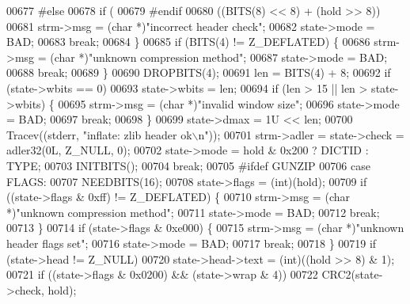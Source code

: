 \begin{DoxyCode}
{{{{00677 #\textcolor{keywordflow}{else}
00678             if (
00679 #endif
00680                 ((BITS(8) << 8) + (hold >> 8)) %
00681                 strm->msg = (\textcolor{keywordtype}{char} *)\textcolor{stringliteral}{"incorrect header check"};
00682                 state->mode = BAD;
00683                 \textcolor{keywordflow}{break};
00684             \}
00685             \textcolor{keywordflow}{if} (BITS(4) != Z\_DEFLATED) \{
00686                 strm->msg = (\textcolor{keywordtype}{char} *)\textcolor{stringliteral}{"unknown compression method"};
00687                 state->mode = BAD;
00688                 \textcolor{keywordflow}{break};
00689             \}
00690             DROPBITS(4);
00691             len = BITS(4) + 8;
00692             \textcolor{keywordflow}{if} (state->wbits == 0)
00693                 state->wbits = len;
00694             \textcolor{keywordflow}{if} (len > 15 || len > state->wbits) \{
00695                 strm->msg = (\textcolor{keywordtype}{char} *)\textcolor{stringliteral}{"invalid window size"};
00696                 state->mode = BAD;
00697                 \textcolor{keywordflow}{break};
00698             \}
00699             state->dmax = 1U << len;
00700             Tracev((stderr, \textcolor{stringliteral}{"inflate:   zlib header ok\(\backslash\)n"}));
00701             strm->adler = state->check = adler32(0L, Z\_NULL, 0);
00702             state->mode = hold & 0x200 ? DICTID : TYPE;
00703             INITBITS();
00704             \textcolor{keywordflow}{break};
00705 \textcolor{preprocessor}{#ifdef GUNZIP}
00706         \textcolor{keywordflow}{case} FLAGS:
00707             NEEDBITS(16);
00708             state->flags = (int)(hold);
00709             \textcolor{keywordflow}{if} ((state->flags & 0xff) != Z\_DEFLATED) \{
00710                 strm->msg = (\textcolor{keywordtype}{char} *)\textcolor{stringliteral}{"unknown compression method"};
00711                 state->mode = BAD;
00712                 \textcolor{keywordflow}{break};
00713             \}
00714             \textcolor{keywordflow}{if} (state->flags & 0xe000) \{
00715                 strm->msg = (\textcolor{keywordtype}{char} *)\textcolor{stringliteral}{"unknown header flags set"};
00716                 state->mode = BAD;
00717                 \textcolor{keywordflow}{break};
00718             \}
00719             \textcolor{keywordflow}{if} (state->head != Z\_NULL)
00720                 state->head->text = (int)((hold >> 8) & 1);
00721             \textcolor{keywordflow}{if} ((state->flags & 0x0200) && (state->wrap & 4))
00722                 CRC2(state->check, hold);
}}}}
\end{DoxyCode}
